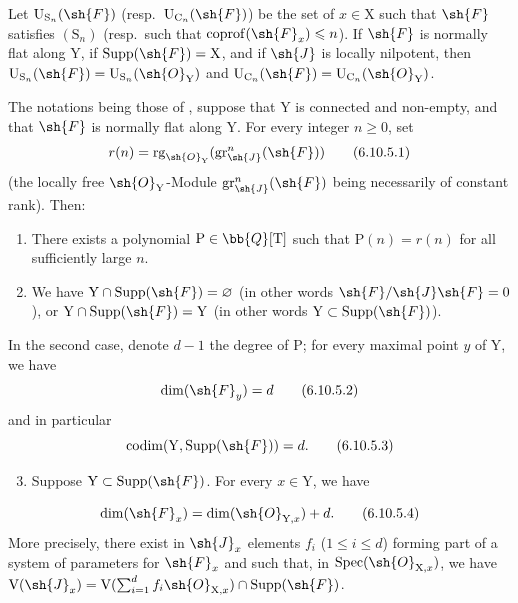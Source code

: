 \begin{corollary}[6.10.4]
\label{IV.6.10.4}
Let $\mathrm{U}_{\mathrm{S}_n}(\sh{F})$ (resp.\ $\mathrm{U}_{\mathrm{C}_n}(\sh{F})$) be the set of $x\in\mathrm{X}$ such that $\sh{F}$ satisfies $(\mathrm{S}_n)$ (resp.\ such that $\operatorname{coprof}(\sh{F}_x)\leqslant n$). If $\sh{F}$ is normally flat along $\mathrm{Y}$, if $\operatorname{Supp}(\sh{F})=\mathrm{X}$, and if $\sh{J}$ is locally nilpotent, then $\mathrm{U}_{\mathrm{S}_n}(\sh{F})=\mathrm{U}_{\mathrm{S}_n}(\sh{O}_\mathrm{Y})$ and $\mathrm{U}_{\mathrm{C}_n}(\sh{F})=\mathrm{U}_{\mathrm{C}_n}(\sh{O}_\mathrm{Y})$.
\end{corollary}

\begin{proposition}[6.10.5]
\label{IV.6.10.5}
The notations being those of , suppose that $\mathrm{Y}$ is connected and non-empty, and that $\sh{F}$ is normally flat along $\mathrm{Y}$. For every integer $n\geqslant 0$, set
\begin{equation}
  r(n) = \operatorname{rg}_{\sh{O}_\mathrm{Y}}(\operatorname{gr}^n_\sh{J}(\sh{F})) \tag{6.10.5.1}\label{IV.6.10.5.1}
\end{equation}
(the locally free $\sh{O}_\mathrm{Y}$-Module $\operatorname{gr}^n_\sh{J}(\sh{F})$ being necessarily of constant rank). Then:
\begin{enumerate}[label=(\roman*)]
  \item There exists a polynomial $\mathrm{P}\in\bb{Q}[\mathrm{T}]$ such that $\mathrm{P}(n)=r(n)$ for all sufficiently large $n$.
  \item We have $\mathrm{Y}\cap\operatorname{Supp}(\sh{F})=\varnothing$ (in other words $\sh{F}/\sh{J}\sh{F}=0$), or $\mathrm{Y}\cap\operatorname{Supp}(\sh{F})=\mathrm{Y}$ (in other words $\mathrm{Y}\subset\operatorname{Supp}(\sh{F})$).
\end{enumerate}
In the second case, denote $d-1$ the degree of $\mathrm{P}$; for every maximal point $y$ of $\mathrm{Y}$, we have
\begin{equation}
  \dim(\sh{F}_y) = d \tag{6.10.5.2}\label{IV.6.10.5.2}
\end{equation}
and in particular
\begin{equation}
  \operatorname{codim}(\mathrm{Y},\operatorname{Supp}(\sh{F})) = d. \tag{6.10.5.3}\label{IV.6.10.5.3}
\end{equation}
\begin{enumerate}[label=(\roman*)]
\setcounter{enumi}{2}
  \item Suppose $\mathrm{Y}\subset\operatorname{Supp}(\sh{F})$. For every $x\in\mathrm{Y}$, we have
\end{enumerate}
\begin{equation}
  \dim(\sh{F}_x) = \dim(\sh{O}_{\mathrm{Y},x}) + d. \tag{6.10.5.4}\label{IV.6.10.5.4}
\end{equation}
More precisely, there exist in $\sh{J}_x$ elements $f_i$ ($1\leqslant i\leqslant d$) forming part of a system of parameters for $\sh{F}_x$  and such that, in $\operatorname{Spec}(\sh{O}_{\mathrm{X},x})$, we have $\mathrm{V}(\sh{J}_x)=\mathrm{V}(\sum_{i=1}^d f_i\sh{O}_{\mathrm{X},x})\cap\operatorname{Supp}(\sh{F})$.
\end{proposition}

